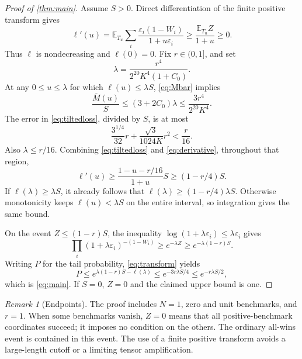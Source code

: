 \documentclass[11pt,reqno]{amsart}
\numberwithin{equation}{section}
\theoremstyle{definition}
\theoremstyle{remark}
\newtheorem{remark}[theorem]{Remark}
\newcommand{\E}{\mathbb E}
\newcommand{\eps}{\varepsilon}
\begin{document}
\begin{proof}[Proof of \cref{thm:main}]
Assume \(S>0\). Direct differentiation of the finite positive transform gives
\begin{equation}\label{eq:derivative}
 \ell'(u)=\E_{T_u}\sum_i
 \frac{\eps_i(1-W_i)}{1+u\eps_i}
 \ge\frac{\E_{T_u}Z}{1+u}\ge0.
\end{equation}
Thus \(\ell\) is nondecreasing and \(\ell(0)=0\). Fix \(r\in(0,1]\), and set
\[
 \lambda=\frac{r^4}{2^{20}K^4(1+C_0)}.
\]
At any \(0\le u\le\lambda\) for which \(\ell(u)\le\lambda S\), \eqref{eq:Mbar} implies
\[
 \frac{\overline M(u)}S
 \le(3+2C_0)\lambda\le\frac{3r^4}{2^{20}K^4}.
\]
The error in \eqref{eq:tiltedloss}, divided by \(S\), is at most
\[
 \frac{3^{1/4}}{32}r+
 \frac{\sqrt3}{1024K}r^2<\frac r{16}.
\]
Also \(\lambda\le r/16\). Combining \eqref{eq:tiltedloss} and \eqref{eq:derivative}, throughout that region,
\[
 \ell'(u)\ge
 \frac{1-u-r/16}{1+u}S\ge(1-r/4)S.
\]
If \(\ell(\lambda)\ge\lambda S\), it already follows that
\(\ell(\lambda)\ge(1-r/4)\lambda S\).
Otherwise monotonicity keeps \(\ell(u)<\lambda S\) on the entire interval, so integration gives the same bound.

On the event \(Z\le(1-r)S\), the inequality
\(\log(1+\lambda\eps_i)\le\lambda\eps_i\) gives
\[
 \prod_i(1+\lambda\eps_i)^{-(1-W_i)}
 \ge e^{-\lambda Z}\ge e^{-\lambda(1-r)S}.
\]
Writing \(P\) for the tail probability, \eqref{eq:transform} yields
\[
 P\le e^{\lambda(1-r)S-\ell(\lambda)}
 \le e^{-3r\lambda S/4}\le e^{-r\lambda S/2},
\]
which is \eqref{eq:main}. If \(S=0\), \(Z=0\) and the claimed upper bound is one.
\end{proof}

\begin{remark}[Endpoints]
The proof includes \(N=1\), zero and unit benchmarks, and \(r=1\).
When some benchmarks vanish, \(Z=0\) means that all positive-benchmark coordinates succeed; it imposes no condition on the others. The ordinary all-wins event is contained in this event. The use of a finite positive transform avoids a large-length cutoff or a limiting tensor amplification.
\end{remark}
\end{document}
